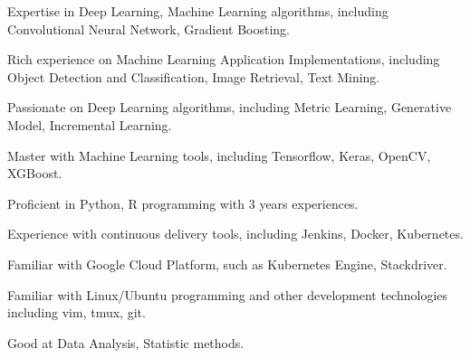 

\begin{cvparagraph}
    
\end{cvparagraph}
\begin{cvparagraph}
    
\end{cvparagraph}

\begin{cvparagraph}
  \begin{cvitems}

    \item {Expertise in Deep Learning, Machine Learning algorithms, including Convolutional Neural Network, Gradient Boosting.}
    \item {Rich experience on Machine Learning Application Implementations, including Object Detection and Classification, Image Retrieval, Text Mining.}
    \item {Passionate on Deep Learning algorithms, including Metric Learning, Generative Model, Incremental Learning.}
    \item {Master with Machine Learning tools, including Tensorflow, Keras, OpenCV, XGBoost.}
    \item {Proficient in Python, R programming with 3 years experiences.}
    \item {Experience with continuous delivery tools, including Jenkins, Docker, Kubernetes.}
    \item {Familiar with Google Cloud Platform, such as Kubernetes Engine, Stackdriver.}
    \item {Familiar with Linux/Ubuntu programming and other development technologies including vim, tmux, git.}
    \item {Good at Data Analysis, Statistic methods.}
  \end{cvitems}
\end{cvparagraph}
